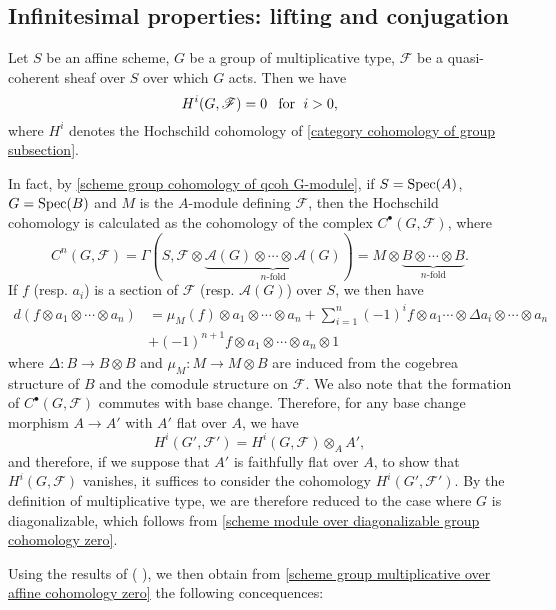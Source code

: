 \subsection{Infinitesimal properties: lifting and conjugation}\label{scheme group multiplicative infinitesimal prop subsection}
\begin{theorem}\label{scheme group multiplicative over affine cohomology zero}
Let $S$ be an affine scheme, $G$ be a group of multiplicative type, $\mathscr{F}$ be a quasi-coherent sheaf over $S$ over which $G$ acts. Then we have 
\[H^i(G,\mathscr{F})=0\hspace{8pt}\text{for}\hspace{6pt} i>0,\]
where $H^i$ denotes the Hochschild cohomology of \autoref{category cohomology of group subsection}.
\end{theorem}

In fact, by \cref{scheme group cohomology of qcoh G-module}, if $S=\mathrm{Spec}(A)$, $G=\mathrm{Spec}(B)$ and $M$ is the $A$-module defining $\mathscr{F}$, then the Hochschild cohomology is calculated as the cohomology of the complex $C^\bullet(G,\mathscr{F})$, where
\[C^n(G,\mathscr{F})=\Gamma(S,\mathscr{F}\otimes\underbrace{\mathscr{A}(G)\otimes\cdots\otimes\mathscr{A}(G)}_{\text{$n$-fold}})=M\otimes\underbrace{B\otimes\cdots\otimes B}_{\text{$n$-fold}}.\]
If $f$ (resp. $a_i$) is a section of $\mathscr{F}$ (resp. $\mathscr{A}(G)$) over $S$, we then have
\begin{align*}
d(f\otimes a_1\otimes\cdots\otimes a_n)&=\mu_M(f)\otimes a_1\otimes\cdots\otimes a_n+\sum_{i=1}^{n}(-1)^if\otimes a_1\cdots\otimes \Delta a_i\otimes\cdots\otimes a_n\\
&+(-1)^{n+1}f\otimes a_1\otimes\cdots\otimes a_n\otimes 1
\end{align*}
where $\Delta:B\to B\otimes B$ and $\mu_M:M\to M\otimes B$ are induced from the cogebrea structure of $B$ and the comodule structure on $\mathscr{F}$. We also note that the formation of $C^\bullet(G,\mathscr{F})$ commutes with base change. Therefore, for any base change morphism $A\to A'$ with $A'$ flat over $A$, we have
\[H^i(G',\mathscr{F}')=H^i(G,\mathscr{F})\otimes_AA',\]
and therefore, if we suppose that $A'$ is faithfully flat over $A$, to show that $H^i(G,\mathscr{F})$ vanishes, it suffices to consider the cohomology $H^i(G',\mathscr{F}')$. By the definition of multiplicative type, we are therefore reduced to the case where $G$ is diagonalizable, which follows from \cref{scheme module over diagonalizable group cohomology zero}.\par
Using the results of (\cite{SGA3-1} ), we then obtain from \cref{scheme group multiplicative over affine cohomology zero} the following concequences:

